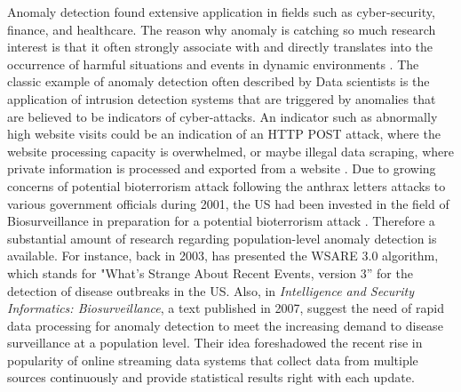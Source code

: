 Anomaly detection found extensive application in fields such as cyber-security, finance, and healthcare. The reason why anomaly is catching so much research interest is that it often strongly associate with and directly translates into the occurrence of harmful situations and events in dynamic environments \citep{chandola2009anomaly, LaRosa2018}. The classic example of anomaly detection often described by Data scientists is the application of intrusion detection systems that are triggered by anomalies that are believed to be indicators of cyber-attacks. An indicator such as abnormally high website visits could be an indication of an HTTP POST attack, where the website processing capacity is overwhelmed, or maybe illegal data scraping, where private information is processed and exported from a website \citep{patcha2007overview, Target2018}. Due to growing concerns of potential bioterrorism attack following the anthrax letters attacks to various government officials during 2001, the US had been invested in the field of Biosurveillance in preparation for a potential bioterrorism attack \citep{grundmann2014current}. Therefore a substantial amount of research regarding population-level anomaly detection is available. For instance, back in 2003, \citep{wong2003bayesian} has presented the WSARE 3.0 algorithm, which stands for "What's Strange About Recent Events, version 3” for the detection of disease outbreaks in the US. Also, in \textit{Intelligence and Security Informatics: Biosurveillance}, a text published in 2007, \citet{bauer2007high} suggest the need of rapid data processing for anomaly detection to meet the increasing demand to disease surveillance at a population level. Their idea foreshadowed the recent rise in popularity of online streaming data systems that collect data from multiple sources continuously and provide statistical results right with each update.  

\newpara

